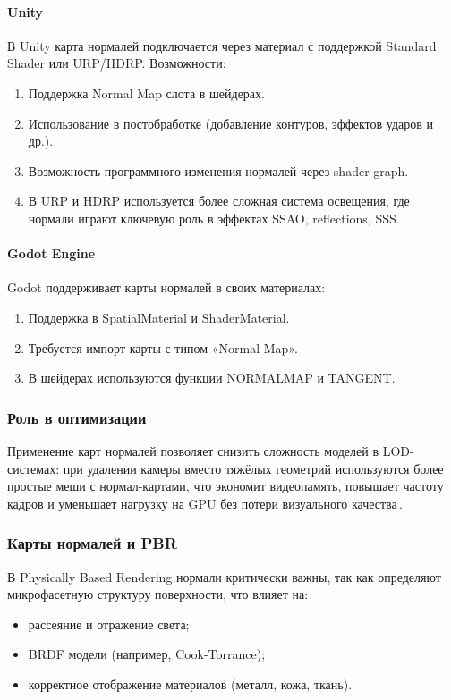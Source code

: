 \paragraph{Unity}

В Unity карта нормалей подключается через материал с поддержкой Standard Shader или URP/HDRP. Возможности:
\begin{enumerate}
	\item Поддержка Normal Map слота в шейдерах.
	\item Использование в постобработке (добавление контуров, эффектов ударов и др.).
	\item Возможность программного изменения нормалей через shader graph.
	\item В URP и HDRP используется более сложная система освещения, где нормали играют ключевую роль в эффектах SSAO, reflections, SSS.
\end{enumerate}

\paragraph{Godot Engine}

Godot поддерживает карты нормалей в своих материалах:
\begin{enumerate}
	\item Поддержка в SpatialMaterial и ShaderMaterial.
	\item Требуется импорт карты с типом «Normal Map».
	\item В шейдерах используются функции NORMALMAP и TANGENT.
\end{enumerate}
\subsubsection{Роль в оптимизации}

Применение карт нормалей позволяет снизить сложность моделей в LOD-системах: при удалении камеры вместо тяжёлых геометрий используются более простые меши с нормал-картами, что экономит видеопамять, повышает частоту кадров и уменьшает нагрузку на GPU без потери визуального качества \cite{umbaugh2022}.
\subsubsection{Карты нормалей и PBR}

В Physically Based Rendering нормали критически важны, так как определяют микрофасетную структуру поверхности, что влияет на:
\begin{itemize}
	\item рассеяние и отражение света;
	\item BRDF модели (например, Cook-Torrance);
	\item корректное отображение материалов (металл, кожа, ткань).
\end{itemize}

